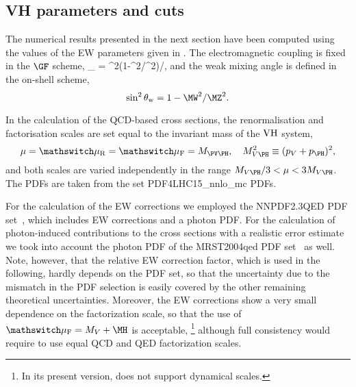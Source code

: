 \subsection{VH parameters and cuts}
\label{sec:VHcuts-sub}

The numerical results presented in the next section have been
computed using the values of the EW parameters given in .
The electromagnetic coupling is fixed in the
$\GF$ scheme, 
\beq
 \alpha_{\GF} = \GF\MW^2(1-\MW^2/\MZ^2)/\pi,
\eeq
and the weak mixing angle is defined in the on-shell scheme,
\begin{equation}
\sin^2\theta_{\mathrm{w}}=1-\MW^2/\MZ^2.
\end{equation}

In the calculation of the QCD-based cross sections, 
the renormalisation and factorisation scales are set equal to the
invariant mass of the $\mathrm{VH}$ system,
\begin{equation}
\label{eq:VH_ren_fac_scales}
\mu=\muR = \muF= M_{\PV\PH}, \quad M_{V\PH}^2\equiv(p_V+p_{\PH})^2,
\end{equation}
and both scales are varied independently in the range $M_{V\PH}/3 < \mu < 3M_{V\PH}$.
The PDFs are taken from the set PDF4LHC15\_nnlo\_mc PDFs.

For the calculation of the EW corrections we employed
the NNPDF2.3QED PDF set~\cite{Ball:2013hta}, which includes
EW corrections and a photon PDF.
For the calculation of photon-induced contributions to the cross sections
with a realistic error estimate we took into account the photon PDF
of the MRST2004qed PDF set~\cite{Martin:2004dh} as well.
%
Note, however, that the relative EW correction factor, which is used in the following,
hardly depends on the PDF set, so that the uncertainty due to the
mismatch in the PDF selection is easily covered by the other remaining
theoretical uncertainties. Moreover, the EW corrections show a very small
dependence on the factorization scale, so that the use of 
$\muF=M_V+\MH$ is acceptable,%
\footnote{In its present version, \HAWK{} does not support dynamical scales.}
although full consistency would require to
use equal QCD and QED factorization scales.


